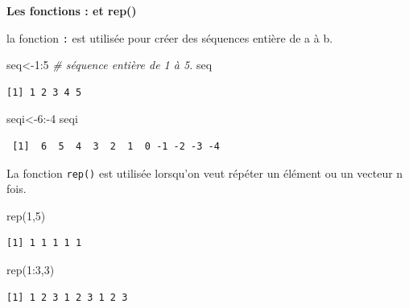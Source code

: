 \documentclass[
  8pt,
  ignorenonframetext,
]{beamer}
\newenvironment{Shaded}{\begin{snugshade}}{\end{snugshade}}
\newcommand{\CommentTok}[1]{\textcolor[rgb]{0.56,0.35,0.01}{\textit{#1}}}
\newcommand{\DecValTok}[1]{\textcolor[rgb]{0.00,0.00,0.81}{#1}}
\newcommand{\FunctionTok}[1]{\textcolor[rgb]{0.00,0.00,0.00}{#1}}
\newcommand{\NormalTok}[1]{#1}
\newcommand{\OtherTok}[1]{\textcolor[rgb]{0.56,0.35,0.01}{#1}}
\newcommand{\SpecialCharTok}[1]{\textcolor[rgb]{0.00,0.00,0.00}{#1}}
\begin{document}
\begin{frame}[fragile]{}
\protect\hypertarget{section}{}
\textbf{Les fonctions : et rep()}

la fonction \texttt{:} est utilisée pour créer des séquences entière de
a à b.

\begin{Shaded}
\begin{Highlighting}[]
\NormalTok{seq}\OtherTok{\textless{}{-}}\DecValTok{1}\SpecialCharTok{:}\DecValTok{5}  \CommentTok{\# séquence entière de 1 à 5.}
\NormalTok{seq}
\end{Highlighting}
\end{Shaded}

\begin{verbatim}
[1] 1 2 3 4 5
\end{verbatim}

\begin{Shaded}
\begin{Highlighting}[]
\NormalTok{seqi}\OtherTok{\textless{}{-}}\DecValTok{6}\SpecialCharTok{:{-}}\DecValTok{4}
\NormalTok{seqi}
\end{Highlighting}
\end{Shaded}

\begin{verbatim}
 [1]  6  5  4  3  2  1  0 -1 -2 -3 -4
\end{verbatim}

La fonction \texttt{rep()} est utilisée lorsqu'on veut répéter un
élément ou un vecteur n fois.

\begin{Shaded}
\begin{Highlighting}[]
\FunctionTok{rep}\NormalTok{(}\DecValTok{1}\NormalTok{,}\DecValTok{5}\NormalTok{)}
\end{Highlighting}
\end{Shaded}

\begin{verbatim}
[1] 1 1 1 1 1
\end{verbatim}

\begin{Shaded}
\begin{Highlighting}[]
\FunctionTok{rep}\NormalTok{(}\DecValTok{1}\SpecialCharTok{:}\DecValTok{3}\NormalTok{,}\DecValTok{3}\NormalTok{)}
\end{Highlighting}
\end{Shaded}

\begin{verbatim}
[1] 1 2 3 1 2 3 1 2 3
\end{verbatim}


\end{frame}
\end{document}
